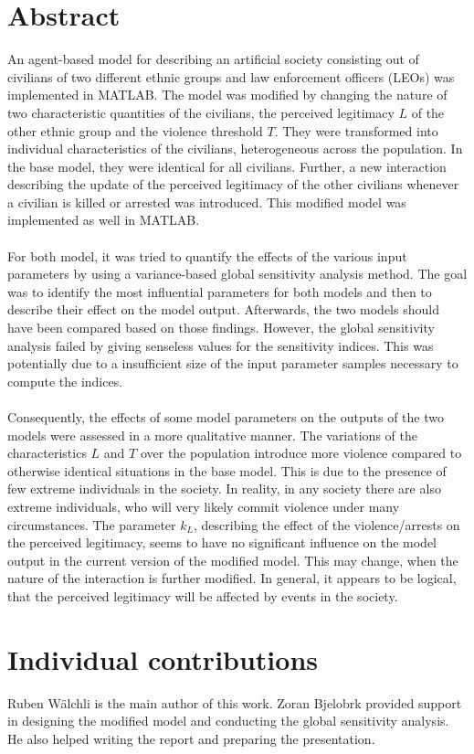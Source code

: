 \documentclass[11pt]{article}
\begin{document}
\section{Abstract}
An agent-based model for describing an artificial society consisting out of civilians of two different ethnic groups and law enforcement officers (LEOs) was implemented in MATLAB. The model was modified by changing the nature of two characteristic quantities of the civilians, the perceived legitimacy $L$ of the other ethnic group and the violence threshold $T$. They were transformed into individual characteristics of the civilians, heterogeneous across the population. In the base model, they were identical for all civilians. Further, a new interaction describing the update of the perceived legitimacy of the other civilians whenever a civilian is killed or arrested was introduced. This modified model was implemented as well in MATLAB.\\
\\
For both model, it was tried to quantify the effects of the various input parameters by using a variance-based global sensitivity analysis method. The goal was to identify the most influential parameters for both models and then to describe their effect on the model output. Afterwards, the two models should have been compared based on those findings. However, the global sensitivity analysis failed by giving senseless values for the sensitivity indices. This was potentially due to a insufficient size of the input parameter samples necessary to compute the indices.\\
\\
Consequently, the effects of some model parameters on the outputs of the two models were assessed in a more qualitative manner. The variations of the characteristics $L$ and $T$ over the population introduce more violence compared to otherwise identical situations in the base model. This is due to the presence of few extreme individuals in the society. In reality, in any society there are also extreme individuals, who will very likely commit violence under many circumstances. The parameter $k_L$, describing the effect of the violence/arrests on the perceived legitimacy, seems to have no significant influence on the model output in the current version of the modified model. This may change, when the nature of the interaction is further modified. In general, it appears to be logical, that the perceived legitimacy will be affected by events in the society.

\section{Individual contributions}
Ruben W\"alchli is the main author of this work. Zoran Bjelobrk provided support in designing the modified model and conducting the global sensitivity analysis. He also helped writing the report and preparing the presentation.
\end{document}
